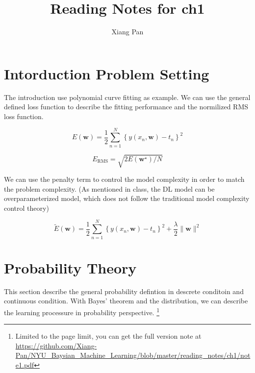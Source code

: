 \documentclass[11pt,en,cite=authoryear]{elegantpaper}
\title{Reading Notes for ch1}
\author{Xiang Pan}
\institute{New York University}
\begin{document}
\setlength{\droptitle}{-10em} 
\section{Intorduction Problem Setting}
The introduction use polynomial curve fitting as example. We can use the general defined loss function to describe the fitting performance and the normilized RMS loss function.




$$E(\mathbf{w})=\frac{1}{2} \sum_{n=1}^{N}\left\{y\left(x_{n}, \mathbf{w}\right)-t_{n}\right\}^{2}$$

$$E_{\mathrm{RMS}}=\sqrt{2 E\left(\mathbf{w}^{\star}\right) / N}$$

We can use the penalty term to control the model complexity in order to match the problem complexity. (As mentioned in class, the DL model can be overparameterized model, which does not follow the traditional model complexity control theory)

$$\widetilde{E}(\mathbf{w})=\frac{1}{2} \sum_{n=1}^{N}\left\{y\left(x_{n}, \mathbf{w}\right)-t_{n}\right\}^{2}+\frac{\lambda}{2}\|\mathbf{w}\|^{2}$$

\section{Probability Theory}
This section describe the general probability defintion in descrete conditoin and continuous condition. With Bayes' theorem and the distribution, we can describe the learning processure in probability perspective.  \footnote{Limited to the page limit, you can get the full version note at \url{https://github.com/Xiang-Pan/NYU_Baysian_Machine_Learning/blob/master/reading_notes/ch1/note1.pdf} }

\end{document}
